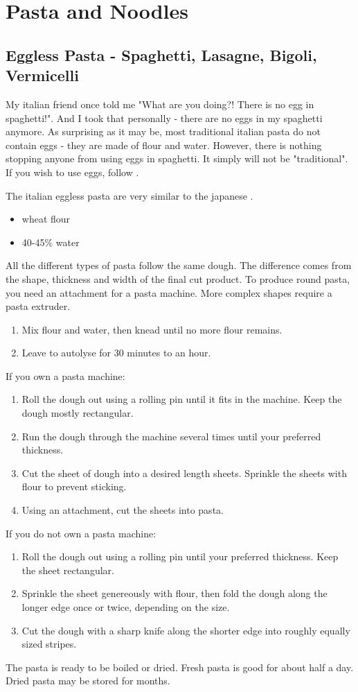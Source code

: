 \chapter{Pasta and Noodles}
\section{Eggless Pasta - Spaghetti, Lasagne, Bigoli, Vermicelli}
My italian friend once told me "What are you doing?! There is no egg in
spaghetti!". And I took that personally - there are no eggs in my spaghetti
anymore. As surprising as it may be, most traditional italian pasta do not
contain eggs - they are made of flour and water.  However, there is nothing
stopping anyone from using eggs in spaghetti. It simply will not be
"traditional". If you wish to use eggs, follow .

The italian eggless pasta are very similar to the japanese .

\begin{itemize}
  \item wheat flour
  \item 40-45\% water
\end{itemize}

All the different types of pasta follow the same dough. The difference comes
from the shape, thickness and width of the final cut product. To produce round
pasta, you need an attachment for a pasta machine. More complex shapes
require a pasta extruder.
\begin{enumerate}
  \item Mix flour and water, then knead until no more flour remains.
  \item Leave to autolyse for 30 minutes to an hour.
  \saveenum
\end{enumerate}
If you own a pasta machine:
\begin{enumerate}
  \contenum
  \item Roll the dough out using a rolling pin until it fits in the machine.
    Keep the dough mostly rectangular.
  \item Run the dough through the machine several times until your preferred
    thickness.
  \item Cut the sheet of dough into a desired length sheets. Sprinkle the
    sheets with flour to prevent sticking.
  \item Using an attachment, cut the sheets into pasta.
\end{enumerate}
If you do not own a pasta machine:
\begin{enumerate}
  \contenum
  \item Roll the dough out using a rolling pin until your preferred thickness.
    Keep the sheet rectangular.
  \item Sprinkle the sheet genereously with flour, then fold the dough along
    the longer edge once or twice, depending on the size.
  \item Cut the dough with a sharp knife along the shorter edge into roughly
    equally sized stripes.
\end{enumerate}
The pasta is ready to be boiled or dried. Fresh pasta is good for about half a
day. Dried pasta may be stored for months.

